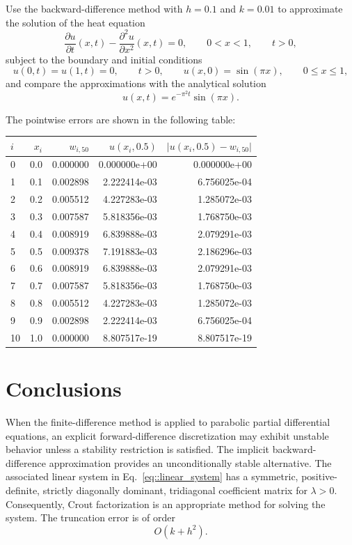 \documentclass[a4paper]{article}
\begin{document}
Use the backward-difference method with $h=0.1$ and $k=0.01$ to approximate the solution of the heat equation
\begin{equation}
\frac{\partial u}{\partial t}(x,t)-\frac{\partial^2u}{\partial x^2}(x,t)=0,\qquad 0<x<1,\qquad t>0,
\end{equation}
subject to the boundary and initial conditions
\begin{equation*}
u(0,t)=u(1,t)=0,\qquad t>0,\qquad u(x,0)=\sin(\pi x),\qquad 0\leq x\leq1,
\end{equation*}
and compare the approximations with the analytical solution
\begin{equation}
u(x,t)=e^{-\pi^2t}\sin(\pi x).
\end{equation}

The pointwise errors are shown in the following table:

\begin{table}[H]
\centering
\begin{tabular}{lrrrr}
\toprule
$i$ & $x_i$ & $w_{i,50}$ & $u(x_i,0.5)$ & $\lvert u(x_i,0.5)-w_{i,50}\rvert$ \\
\midrule
0  & 0.0 & 0.000000 & 0.000000e+00 & 0.000000e+00 \\
1  & 0.1 & 0.002898 & 2.222414e-03 & 6.756025e-04 \\
2  & 0.2 & 0.005512 & 4.227283e-03 & 1.285072e-03 \\
3  & 0.3 & 0.007587 & 5.818356e-03 & 1.768750e-03 \\
4  & 0.4 & 0.008919 & 6.839888e-03 & 2.079291e-03 \\
5  & 0.5 & 0.009378 & 7.191883e-03 & 2.186296e-03 \\
6  & 0.6 & 0.008919 & 6.839888e-03 & 2.079291e-03 \\
7  & 0.7 & 0.007587 & 5.818356e-03 & 1.768750e-03 \\
8  & 0.8 & 0.005512 & 4.227283e-03 & 1.285072e-03 \\
9  & 0.9 & 0.002898 & 2.222414e-03 & 6.756025e-04 \\
10 & 1.0 & 0.000000 & 8.807517e-19 & 8.807517e-19 \\
\bottomrule
\end{tabular}
\end{table}

\section{Conclusions}

When the finite-difference method is applied to parabolic partial differential equations, an explicit forward-difference discretization may exhibit unstable behavior unless a stability restriction is satisfied. The implicit backward-difference approximation provides an unconditionally stable alternative. The associated linear system in Eq.~\ref{eq::linear_system} has a symmetric, positive-definite, strictly diagonally dominant, tridiagonal coefficient matrix for $\lambda>0$. Consequently, Crout factorization is an appropriate method for solving the system. The truncation error is of order
\begin{equation}
O(k+h^2).
\end{equation}
\end{document}

